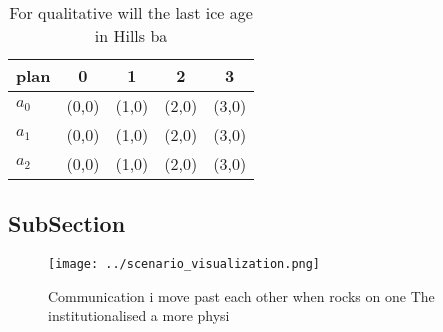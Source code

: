 \documentclass[a4paper]{article}
\begin{document}
\begin{table}
\begin{adjustbox}{width=0.6\columnwidth}
\begin{tabular}{|l|l|l|l|l|}
\hline
\textbf{plan} & \multicolumn{1}{c|}{\textbf{0}} & \multicolumn{1}{c|}{\textbf{1}} & \multicolumn{1}{c|}{\textbf{2}} & \multicolumn{1}{c|}{\textbf{3}} \\ \hline
\textbf{$a_0$}  & (0,0) & (1,0) & (2,0) & (3,0) \\ \hline
\textbf{$a_1$}  & (0,0) & (1,0) & (2,0) & (3,0) \\ \hline
\textbf{$a_2$}  & (0,0) & (1,0) & (2,0) & (3,0) \\ \hline
\end{tabular}
\end{adjustbox}
\caption{For qualitative will the last ice age in Hills ba
}
\end{table}

\subsection{SubSection}

\begin{figure}
\centering
\texttt{[image: ../scenario\_visualization.png]}
\caption{Communication i move past each other when rocks on one The institutionalised a more physi
}
\end{figure}
 
\end{document}
